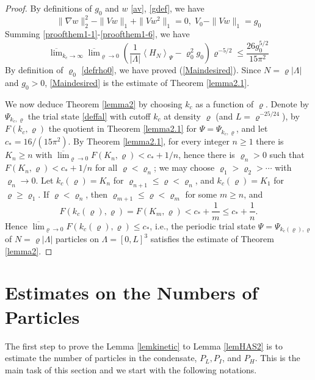 \documentclass[11pt]{article}
\numberwithin{equation}{section}
\newcommand{\beq}{\begin{equation}}
\newcommand{\eeq}{\end{equation}}
\renewcommand\rho\varrho
\theoremstyle{definition}
\begin{document}
\begin{proof}
By definitions of $g_0$ and $w$ \eqref{av}, \eqref{gdef}, we have
\beq
 \|\nabla w\|_2^2-\|Vw\|_1+\|Vw^2\|_1=0, \;  
V_0-\|Vw\|_1=g_0
\eeq
Summing  \eqref{proofthem1-1}-\eqref{proofthem1-6}, we have 
\beq
\overline\lim_{k_c\to\infty}\overline\lim_{\rho\to0}
\left(\frac{1}{|\Lambda|}\left\langle H_{N}\right\rangle_{\Psi}-\rho^2_0g_0\right)\rho^{-5/2}
\leq \frac{26g_0^{5/2}}{15\pi^2}
\eeq
By definition of $\rho_0$ \eqref{defrho0}, we have proved (\ref{Maindesired}).
Since $N=\rho|\Lambda|$ and $g_0>0$, \eqref{Maindesired} is the estimate of Theorem \ref{lemma2.1}.

We now deduce Theorem \ref{lemma2} by choosing $k_c$ as a function of $\rho$.
Denote by $\Psi_{k_c,\rho}$ the trial state \eqref{deffal} with cutoff $k_c$ at density $\rho$ (and $L=\rho^{-25/24}$),
by $F(k_c,\rho)$ the quotient in Theorem \ref{lemma2.1} for $\Psi=\Psi_{k_c,\rho}$, and let $c_*=16/(15\pi^2)$.
By Theorem \ref{lemma2.1}, for every integer $n\geq 1$ there is $K_n\geq n$ with
$\overline\lim_{\rho\to0}F(K_n,\rho)<c_*+1/n$, hence there is $\rho_n>0$ such that $F(K_n,\rho)<c_*+1/n$
for all $\rho<\rho_n$; we may choose $\rho_1>\rho_2>\cdots$ with $\rho_n\to0$.
Let $k_c(\rho)=K_n$ for $\rho_{n+1}\leq\rho<\rho_n$, and $k_c(\rho)=K_1$ for $\rho\geq\rho_1$.
If $\rho<\rho_n$, then $\rho_{m+1}\leq\rho<\rho_m$ for some $m\geq n$, and
\[
F(k_c(\rho),\rho)=F(K_m,\rho)<c_*+\frac 1m\leq c_*+\frac 1n .
\]
Hence $\overline\lim_{\rho\to0}F(k_c(\rho),\rho)\leq c_*$, i.e., the periodic trial state
$\Psi=\Psi_{k_c(\rho),\rho}$ of $N=\rho|\Lambda|$ particles on $\Lambda=[0,L]^3$ satisfies the estimate of
Theorem \ref{lemma2}.
\end{proof}

\section{Estimates on the Numbers of Particles}

The first step to prove the Lemma \ref{lemkinetic} to Lemma \ref{lemHAS2} is to estimate the number of 
particles in the condensate, $P_{L}, P_{I}$, and $P_{H}$. This is the main task of this section and 
we start with  the following  notations.
\end{document}
